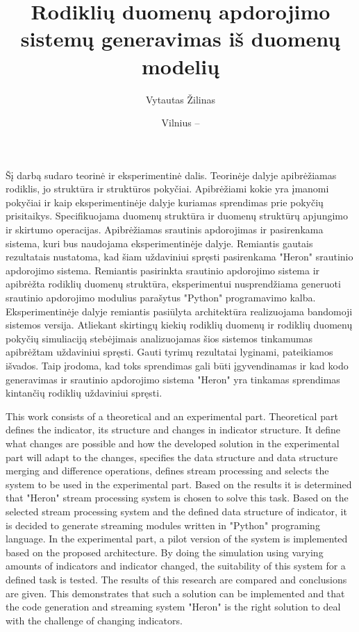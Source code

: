 \documentclass{VUMIFPSbakalaurinis}
\title{Rodiklių duomenų apdorojimo sistemų generavimas iš duomenų modelių}
\author{Vytautas Žilinas}
\date{Vilnius – \the\year}
\begin{document}
 
\maketitle

\cleardoublepage{}
\setcounter{page}{2}

Šį darbą sudaro teorinė ir eksperimentinė dalis. Teorinėje dalyje apibrėžiamas rodiklis, jo struktūra ir struktūros pokyčiai. Apibrėžiami kokie yra įmanomi pokyčiai ir kaip eksperimentinėje dalyje kuriamas sprendimas prie pokyčių prisitaikys. Specifikuojama duomenų struktūra ir duomenų struktūrų apjungimo ir skirtumo operacijas. Apibrėžiamas srautinis apdorojimas ir pasirenkama sistema, kuri bus naudojama eksperimentinėje dalyje. Remiantis gautais rezultatais
nustatoma, kad šiam uždaviniui spręsti pasirenkama "Heron" srautinio apdorojimo sistema. Remiantis pasirinkta srautinio apdorojimo sistema ir apibrėžta rodiklių duomenų struktūra, eksperimentui nusprendžiama generuoti srautinio apdorojimo modulius parašytus "Python" programavimo kalba. Eksperimentinėje dalyje remiantis pasiūlyta architektūra realizuojama bandomoji sistemos versija. Atliekant skirtingų kiekių rodiklių duomenų ir rodiklių duomenų pokyčių simuliaciją stebėjimais analizuojamas šios sistemos tinkamumas apibrėžtam uždaviniui spręsti. Gauti tyrimų rezultatai lyginami, pateikiamos išvados. Taip įrodoma, kad toks sprendimas gali būti įgyvendinamas ir kad kodo generavimas ir srautinio apdorojimo sistema "Heron" yra tinkamas sprendimas kintančių rodiklių uždaviniui spręsti.

This work consists of a theoretical and an experimental part. Theoretical part defines the indicator, its structure and changes in indicator structure. It define what changes are possible and how the developed solution in the experimental part will adapt to the changes, specifies the data structure and data structure merging and difference operations, defines stream processing and selects the system to be used in the experimental part. Based on the results
it is determined that "Heron" stream processing system is chosen to solve this task. Based on the selected stream processing system and the defined data structure of indicator, it is decided to generate streaming modules written in "Python" programing language. In the experimental part, a pilot version of the system is implemented based on the proposed architecture. By doing the simulation using varying amounts of indicators and indicator changed, the suitability of this system for a defined task is tested. The results of this research are compared and conclusions are given. This demonstrates that such a solution can be implemented and that the code generation and streaming system "Heron" is the right solution to deal with the challenge of changing indicators.
\end{document}
